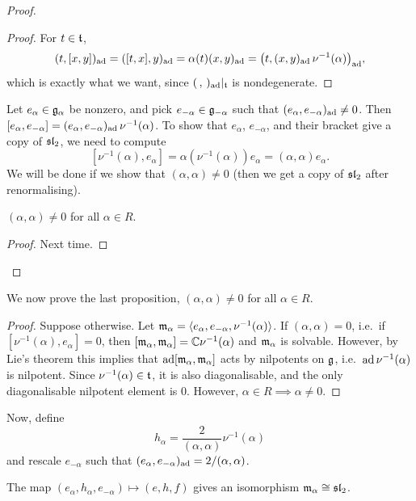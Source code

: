 \begin{proof}
\begin{alist}
    \begin{proof}
    For $t \in \at$,
    \[
      (t, [x, y])_{\ad} = ([t, x], y)_{\ad} = \alpha(t)(x, y)_{\ad}
        = \bigl(t, (x, y)_{\ad}\,\nu^{-1}(\alpha)\bigr)_{\ad},
    \]
    which is exactly what we want, since $(\,,\,)_{\ad}|_\at$ is
    nondegenerate.
    \end{proof}
  \item Let $e_\alpha \in \g_\alpha$ be nonzero, and pick
    $e_{-\alpha} \in \g_{-\alpha}$ such that $(e_\alpha, e_{-\alpha})_{\ad} \neq 0$.
    Then $[e_\alpha, e_{-\alpha}] = (e_\alpha, e_{-\alpha})_{\ad}\,\nu^{-1}(\alpha)$.
    To show that $e_\alpha$, $e_{-\alpha}$, and their bracket give a copy of
    $\sl_2$, we need to compute
    \[
      [\nu^{-1}(\alpha), e_\alpha] = \alpha(\nu^{-1}(\alpha))e_\alpha = (\alpha, \alpha)e_\alpha.
    \]
    We will be done if we show that $(\alpha, \alpha) \neq 0$ (then we get a
    copy of $\sl_2$ after renormalising).

    \begin{proposition}
    $(\alpha, \alpha) \neq 0$ for all $\alpha \in R$.
    \end{proposition}

    \begin{proof}
    Next time.
    \end{proof}
\end{alist}
\let\qed\relax
\end{proof}

 We now prove the last proposition, $(\alpha, \alpha) \neq 0$ for
all $\alpha \in R$.

\begin{proof}
Suppose otherwise. Let
$\fm_\alpha = \langle e_\alpha, e_{-\alpha}, \nu^{-1}(\alpha)\rangle$. If
$(\alpha, \alpha) = 0$, i.e.\ if $[\nu^{-1}(\alpha), e_\alpha] = 0$, then
$[\fm_\alpha, \fm_\alpha] = \C\nu^{-1}(\alpha)$ and $\fm_\alpha$ is solvable.
However, by Lie's theorem this implies that $\ad[\fm_\alpha, \fm_\alpha]$ acts
by nilpotents on $\g$, i.e.\ $\ad\nu^{-1}(\alpha)$ is nilpotent. Since
$\nu^{-1}(\alpha) \in \at$, it is also diagonalisable, and the only
diagonalisable nilpotent element is $0$. However,
$\alpha \in R \implies \alpha \neq 0$.
\end{proof}

Now, define
\[
  h_\alpha = \frac{2}{(\alpha, \alpha)}\nu^{-1}(\alpha)
\]
and rescale $e_{-\alpha}$ such that $(e_\alpha, e_{-\alpha})_{\ad} = 2/(\alpha, \alpha)$.

\begin{exercise}
The map $(e_\alpha, h_\alpha, e_{-\alpha}) \mapsto (e, h, f)$ gives an
isomorphism $\fm_\alpha \cong \sl_2$.
\end{exercise}


